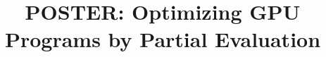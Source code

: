 \documentclass[sigplan]{acmart}\settopmatter{printacmref=false, printfolios=false}
\begin{document}
\title[POSTER: Optimizing GPU Programs by Partial Evaluation]{POSTER: Optimizing GPU Programs by Partial Evaluation}         %




\end{document}
